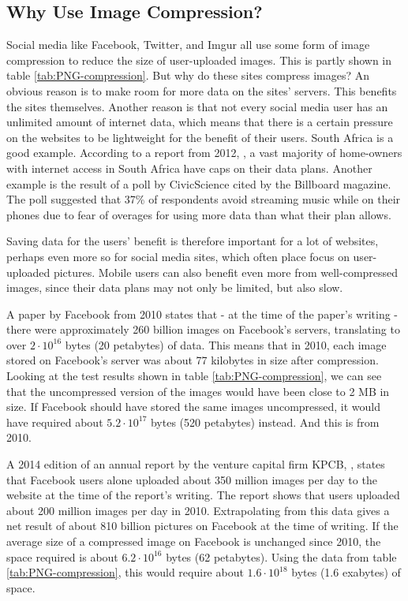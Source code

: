 \subsection{Why Use Image Compression?}
\label{sec:whycompression}
Social media like Facebook, Twitter, and Imgur all use some form of image compression to reduce the size of user-uploaded images.
This is partly shown in table \ref{tab:PNG-compression}.
But why do these sites compress images?
An obvious reason is to make room for more data on the sites' servers.
This benefits the sites themselves.
Another reason is that not every social media user has an unlimited amount of internet data, which means that there is a certain pressure on the websites to be lightweight for the benefit of their users.
South Africa is a good example.
According to a report from 2012, \citep{chetty_2012}, a vast majority of home-owners with internet access in South Africa have caps on their data plans.
Another example is the result of a poll by CivicScience \citep{tmobilemusic} cited by the Billboard magazine.
The poll suggested that 37\% of respondents avoid streaming music while on their phones due to fear of overages for using more data than what their plan allows.

Saving data for the users' benefit is therefore important for a lot of websites, perhaps even more so for social media sites, which often place focus on user-uploaded pictures.
Mobile users can also benefit even more from well-compressed images, since their data plans may not only be limited, but also slow.

A paper by Facebook from 2010 \citep{beaver2010} states that - at the time of the paper's writing - there were approximately 260 billion images on Facebook's servers, translating to over $2\cdot10^{16}$ bytes (20 petabytes) of data.
This means that in 2010, each image stored on Facebook's server was about 77 kilobytes in size after compression.
Looking at the test results shown in table \ref{tab:PNG-compression}, we can see that the uncompressed version of the images would have been close to 2 MB in size.
If Facebook should have stored the same images uncompressed, it would have required about $5.2\cdot10^{17}$ bytes (520 petabytes) instead.
And this is from 2010.

A 2014 edition of an annual report by the venture capital firm KPCB, \citep{meeker2014internet}, states that Facebook users alone uploaded about
350 million images per day to the website at the time of the report's writing.
The report shows that users uploaded about 200 million images per day in 2010.
Extrapolating from this data gives a net result of about 810 billion pictures on Facebook at the time of writing.
If the average size of a compressed image on Facebook is unchanged since 2010, the space required is about $6.2\cdot10^{16}$ bytes (62 petabytes).
Using the data from table \ref{tab:PNG-compression}, this would require about $1.6\cdot10^{18}$ bytes (1.6 exabytes) of space.

